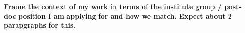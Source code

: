 

\textbf{Frame the context of my work in terms of the institute group / post-doc position I am applying for and how we match. Expect about 2 parapgraphs for this.}


